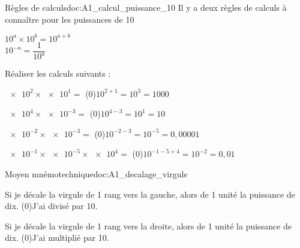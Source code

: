\pasCorrection{\vspace*{-18pt}}
\begin{doc}{Règles de calculs}{doc:A1_calcul_puissance_10}
  Il y a deux règles de calculs à connaître pour les puissances de 10
  \begin{importants}
    \pointCyan $10^a \times 10^b = 10^{a + b}$ \\   
    \pointCyan $10^{-a} = \dfrac{1}{10^a}$
  \end{importants}
\end{doc}


\numeroQuestion Réaliser les calculs suivants :
\pasCorrection{\vspace*{-4pt}}
\begin{listePoints}[2]
  \setlength\itemsep{-4pt}
  \item $\num{e2} \times \num{e1}  =$ \texteTrou(0){$10^{2 + 1} = 10^3 = 1000$}
  \item $\num{e4} \times \num{e-3} =$ \texteTrou(0){$10^{4 - 3} = 10^1 = 10$}
  \item $\num{e-2}\times \num{e-3} =$ \texteTrou(0){$10^{-2 -3} = 10^{-5} = 0,00001$}
  \item $\num{e-1}\times \num{e-5}\times \num{e4}=$ \texteTrou(0){$10^{-1 -5 +4} = 10^{-2} = 0,01$}
\end{listePoints}


\pasCorrection{\vspace*{-18pt}}
\begin{doc}{Moyen mnémotechnique}{doc:A1_decalage_virgule}
  \vspace*{-8pt}
  \begin{listePoints}
    \setlength\itemsep{-8pt}
    \item Si je décale la virgule de 1 rang vers la gauche, alors
     de 1 unité la puissance de dix. \texteTrou(0){J'ai divisé par 10.}
    \item Si je décale la virgule de 1 rang vers la droite, alors
     de 1 unité la puissance de dix. \texteTrou(0){J'ai multiplié par 10.}
  \end{listePoints}
\end{doc}


\newpage
\vspace*{-36pt}

